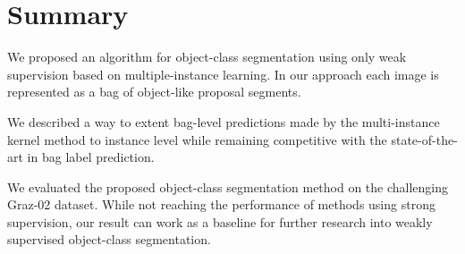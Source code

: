 \section{Summary}

We proposed an algorithm for object-class segmentation using only weak
supervision based on multiple-instance learning. In our approach each image is
represented as a bag of object-like proposal segments.

We described a way to extent bag-level predictions made by the multi-instance
kernel method to instance level while remaining competitive with the
state-of-the-art in bag label prediction.

We evaluated the proposed object-class segmentation method on the challenging
Graz-02 dataset. While not reaching the performance of methods using strong
supervision, our result can work as a baseline for further research into weakly
supervised object-class segmentation.
